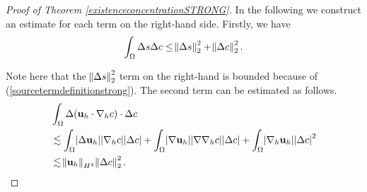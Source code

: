 \documentclass[11pt, a4paper]{article}
\begin{document}
\begin{proof}[Proof of Theorem \ref{existenceconcentrationSTRONG}]
In the following we construct an estimate for each term on the right-hand side. Firstly, we have
%
\begin{equation} \label{term1estimateGE}
\int_\Omega \Delta s \Delta c \leq \norm{\Delta s}_2^2 + \norm{\Delta c}_2^2.
\end{equation}

Note here that the $\norm{\Delta s}_2^2$ term on the right-hand is bounded because of (\ref{sourcetermdefinitionstrong}). The second term can be estimated as follows.
%
\begin{equation} \label{term2estimateGE}
\begin{split}
& \int_\Omega \Delta ( \mathbf{u}_h \cdot \nabla_h c) \cdot \Delta c \\
& \lesssim \int_\Omega \abs{\Delta \mathbf{u}_h} \abs{\nabla_h c} \abs{\Delta c} + \int_\Omega \abs{\nabla \mathbf{u}_h} \abs{\nabla \nabla_h c} \abs{\Delta c} + \int_\Omega \abs{\nabla_h \mathbf{u}_h} \abs{\Delta c}^2 \\
& \lesssim \norm{\mathbf{u}_h}_{H^4} \norm{\Delta c}_2^2.
\end{split}
\end{equation}


\end{proof}
\end{document}
